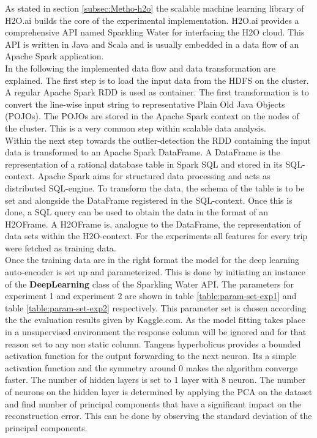 \documentclass{vldb}
\begin{document}
As stated in section \ref{subsec:Metho-h2o} the scalable machine learning library of H2O.ai builds the core of the experimental implementation. H2O.ai provides a comprehensive API named Sparkling Water for interfacing the H2O cloud. This API is written in Java and Scala and is usually embedded in a data flow of an Apache Spark application. \\
In the following the implemented data flow and data transformation are explained. The first step is to load the input data from the HDFS on the cluster. A regular Apache Spark RDD is used as container. The first transformation is to convert the line-wise input string to representative Plain Old Java Objects (POJOs). The POJOs are stored in the Apache Spark context on the nodes of the cluster. This is a very common step within scalable data analysis.\\
Within the next step towards the outlier-detection the RDD containing the input data is transformed to an Apache Spark DataFrame. A DataFrame is the representation of a rational database table in Spark SQL and stored in its SQL-context. Apache Spark aims for structured data processing and acts as distributed SQL-engine. To transform the data, the schema of the table is to be set and alongside the DataFrame registered in the SQL-context. Once this is done, a SQL query can be used to obtain the data in the format of an H2OFrame. A H2OFrame is, analogue to the DataFrame, the representation of data sets within the H2O-context. For the experiments all features for every trip were fetched as training data.\\
Once the training data are in the right format the model for the deep learning auto-encoder is set up and parameterized. This is done by initiating an instance of the \textbf{DeepLearning} class of the Sparkling Water API. The parameters for experiment 1 and experiment 2 are shown in table \ref{table:param-set-exp1} and table \ref{table:param-set-exp2} respectively. This parameter set is chosen according the the evaluation results given by Kaggle.com. As the model fitting takes place in a unsupervised environment the response column will be ignored and for that reason set to any non static column. Tangens hyperbolicus provides a bounded activation function for the output forwarding to the next neuron. Its a simple activation function and the symmetry around 0 makes the algorithm converge faster. The number of hidden layers is set to 1 layer with 8 neuron. The number of neurons on the hidden layer is determined by applying the PCA on the dataset and find number of principal components that have a significant impact on the reconstruction error. This can be done by observing the standard deviation of the principal components.
\end{document}

